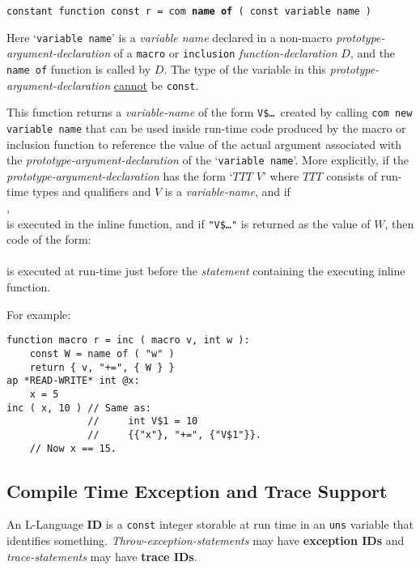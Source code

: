 \documentclass[12pt]{article}
\newcommand{\key}[1]{{\rm \bfseries #1}}
\newcommand{\ttkey}[1]{{\tt \bfseries #1}}
\newcommand{\skey}[2]{{\rm \bfseries #1#2}}
\newenvironment{indpar}[1][0.3in]%
	{\begin{list}{}%
		     {\setlength{\itemsep}{0in}%
		      \setlength{\topsep}{0in}%
		      \setlength{\parsep}{1ex}%
		      \setlength{\labelwidth}{#1}%
		      \setlength{\leftmargin}{#1}%
		      \addtolength{\leftmargin}{\labelsep}}%
	 \item}%
	{\end{list}}
\begin{document}
{\tt constant function const r = com \ttkey{name of} ( const variable name )}
\begin{indpar}
Here `{\tt variable name}' is a {\em variable name}
declared in a non-macro {\em prototype-argument-declaration} of a
{\tt macro} or {\tt inclusion} {\em function-declaration} $D$,
and the {\tt name of} function is called by $D$.
The type of the variable
in this {\em proto\-type-argument-declaration} \underline{cannot}
be {\tt const}.

This function returns a {\em variable-name} of the form
{\tt V\$\ldots}~created by calling {\tt com new variable name}
that can be used inside run-time code produced by the macro or inclusion
function to reference the value of the actual argument associated with
the {\em prototype-argument-declaration} of the `{\tt variable name}'.
More explicitly,
if the {\em proto\-type-argument-declaration} has the form `$TTT$ $V$'
where $TTT$ consists of run-time types and qualifiers and $V$ is a
{\em variable-name}, and if \\
\hspace*{1in}{\tt $W$ = name of ( "$V$" )}, \\
is executed in the inline function,
and if {\tt "V\$\ldots"} is returned as the value of $W$,
then code of the form: \\
 \\
is executed at run-time just before the {\em statement} containing
the executing inline function.
\end{indpar}

For example:
\begin{indpar}[1em]\begin{verbatim}
function macro r = inc ( macro v, int w ):
    const W = name of ( "w" )
    return { v, "+=", { W } }
ap *READ-WRITE* int @x:
    x = 5
inc ( x, 10 ) // Same as:
              //     int V$1 = 10
              //     {{"x"}, "+=", {"V$1"}}.
    // Now x == 15.
\end{verbatim}\end{indpar}

\subsection{Compile Time Exception and Trace Support}
\label{COMPILE-TIME-EXCEPTION-AND-TRACE-SUPPORT}

An L-Language \key{ID} is a {\tt const} integer storable
at run time in an {\tt uns} variable that identifies something.
{\em Throw-exception-statements} may have \skey{exception ID}s
and {\em trace-statements} may have \skey{trace ID}s.
\end{document}
